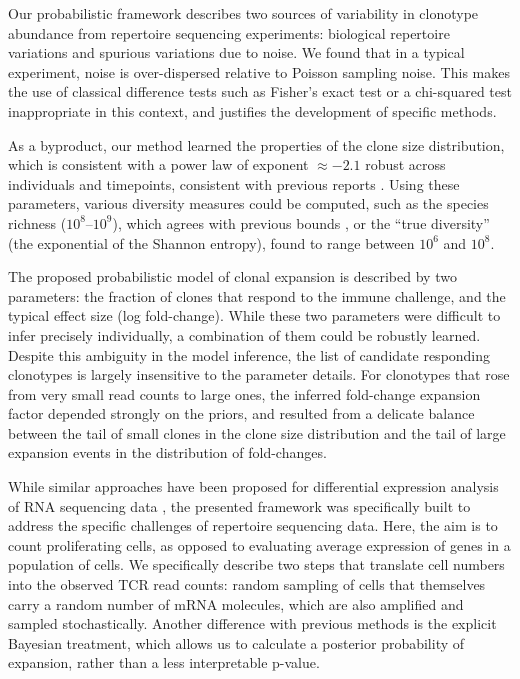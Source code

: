 Our probabilistic framework describes two sources of variability in clonotype abundance from repertoire sequencing experiments: biological repertoire variations and spurious variations due to noise. We found that in a typical experiment, noise is over-dispersed relative to Poisson sampling noise. This makes the use of classical difference tests such as Fisher's exact test or a chi-squared test inappropriate in this context, and justifies the development of specific methods.

As a byproduct, our method learned the properties of the clone size distribution, which is consistent with a power law of exponent $\approx -2.1$ robust across individuals and timepoints, consistent with previous reports \cite{Mora2016e,Gerritsen_thesis,Greef2019}. Using these parameters, various diversity measures could be computed, such as the species richness ($10^8$--$10^9$), which agrees with previous bounds \cite{Qi2014,Lythe2016}, or the ``true diversity'' (the exponential of the Shannon entropy), found to range between $10^6$ and $10^8$.

The proposed probabilistic model of clonal expansion is described by two parameters: the fraction of clones that respond to the immune challenge, and the typical effect size (log fold-change). While these two parameters were difficult to infer precisely individually, a combination of them could be robustly learned. Despite this ambiguity in the model inference, the list of candidate responding clonotypes is largely insensitive to the parameter details. For clonotypes that rose from very small read counts to large ones, the inferred fold-change expansion factor depended strongly on the priors, and resulted from a delicate balance between the tail of small clones in the clone size distribution and the tail of large expansion events in the distribution of fold-changes.

While similar approaches have been proposed for differential expression analysis of RNA sequencing data \cite{Robinson2008,Robinson2010,Anders2010,Love2014}, the presented  framework was specifically built to address the specific challenges of repertoire sequencing data. Here, the aim is to count proliferating cells, as opposed to evaluating average expression of genes in a population of cells. We specifically describe two steps that translate cell numbers into the observed TCR read counts: random sampling of cells that themselves carry a random number of mRNA molecules, which are also amplified and sampled stochastically. Another difference with previous methods is the explicit Bayesian treatment, which allows us to calculate a posterior probability of expansion, rather than a less interpretable p-value.

